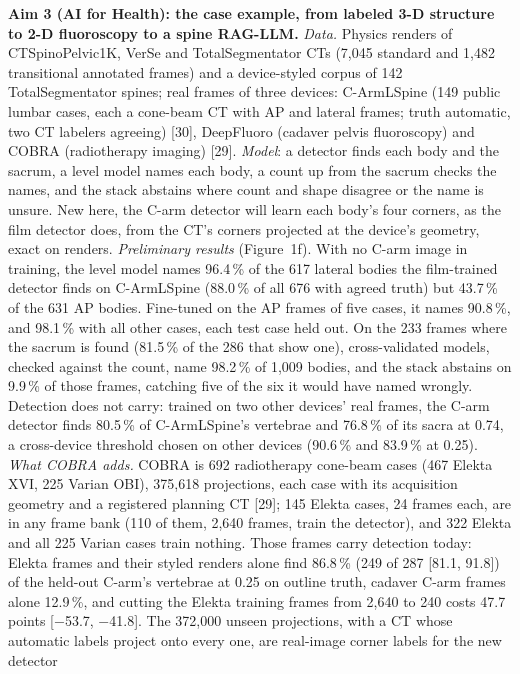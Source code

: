 \documentclass[10pt,letterpaper]{article}
\newcommand{\aim}[1]{{\color{teal}\bfseries #1}}
\newcommand{\pct}{\,\%}
\begin{document}
\aim{Aim 3 (AI for Health): the case example, from labeled 3-D structure to 2-D fluoroscopy to a spine RAG-LLM.} \emph{Data.} Physics renders
of CTSpinoPelvic1K, VerSe and TotalSegmentator CTs (7,045 standard and 1,482 transitional annotated frames) and a
device-styled corpus of 142 TotalSegmentator spines; real frames of three devices: C-ArmLSpine (149 public lumbar
cases, each a cone-beam CT with AP and lateral frames; truth automatic, two CT labelers agreeing) [30], DeepFluoro (cadaver pelvis fluoroscopy) and COBRA (radiotherapy imaging) [29]. \emph{Model}: a
detector finds each body and the sacrum, a level model names each body, a count up from the sacrum checks the names,
and the stack abstains where count and shape disagree or the name is unsure. New here, the C-arm detector will learn
each body's four corners, as the film detector does, from the CT's corners projected at the device's geometry,
exact on renders. \emph{Preliminary results} (Figure~1f). With no C-arm image in training, the level
model names 96.4\pct{} of the 617 lateral bodies the film-trained detector finds on C-ArmLSpine (88.0\pct{} of all 676
with agreed truth) but 43.7\pct{} of the 631 AP bodies. Fine-tuned on the AP frames of five cases, it names
90.8\pct{}, and 98.1\pct{} with all other cases, each test case held out. On the 233 frames where the sacrum is found
(81.5\pct{} of the 286 that show one), cross-validated models, checked against the count, name 98.2\pct{} of 1,009
bodies, and the stack abstains on 9.9\pct{} of those frames, catching five of the six it would have named wrongly.
Detection does not carry: trained on two other devices' real frames, the C-arm detector finds 80.5\pct{} of
C-ArmLSpine's vertebrae and 76.8\pct{} of its sacra at 0.74, a cross-device threshold chosen on other devices
(90.6\pct{} and 83.9\pct{} at 0.25). \emph{What COBRA adds.} COBRA is 692 radiotherapy
cone-beam cases (467 Elekta XVI, 225 Varian OBI), 375,618 projections, each case with its acquisition geometry and a registered planning CT [29]; 145 Elekta cases, 24 frames each, are in any frame bank (110 of them, 2,640 frames, train the detector), and 322 Elekta and all 225 Varian cases train nothing. Those frames carry detection today: Elekta frames and their styled renders alone find
86.8\pct{} (249 of 287 [81.1, 91.8]) of the held-out C-arm's vertebrae at 0.25 on outline truth, cadaver C-arm frames
alone 12.9\pct{}, and cutting the Elekta training frames from 2,640 to 240 costs 47.7 points [$-$53.7, $-$41.8]. The 372,000
unseen projections, with a CT whose automatic labels project onto every one, are real-image corner labels for the new detector
\end{document}
